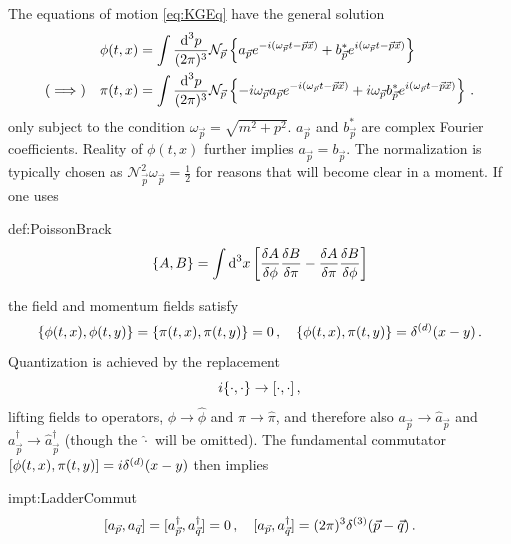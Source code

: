 The equations of motion \eqref{eq:KGEq} have the general solution
\begin{subequations}
    \begin{align}
        \phi(t,x)               & =\int\frac{\text{d} ^3p}{(2\pi)^3}\mathcal{N}_{\vec{p}}\left\{a_{\vec{p}}e^{-{i}(\omega_{\vec{p}}t-\vec{p}\vec{x})}+b_{\vec{p}}^* e^{{i}(\omega_{\vec{p}}t-\vec{p}\vec{x})}\right\}                                                 \\
        (\implies)\quad\pi(t,x) & =\int\frac{\text{d} ^3p}{(2\pi)^3}\mathcal{N}_{\vec{p}}\left\{-{i}\omega_{\vec{p}}a_{\vec{p}}e^{-{i}(\omega_{\vec{p}}t-\vec{p}\vec{x})}+{i}\omega_{\vec{p}}b_{\vec{p}}^* e^{{i}(\omega_{\vec{p}}t-\vec{p}\vec{x})}\right\}\,.
    \end{align}
\end{subequations}
only subject to the condition $\omega_{\vec{p}}=\sqrt{m^2+p^2}$. $a_{\vec{p}}$ and $b_{\vec{p}}^*$ are complex Fourier coefficients. Reality of $\phi(t,x)$ further implies $a_{\vec{p}}=b_{\vec{p}}$. The normalization is typically chosen as $\mathcal{N}_{\vec{p}}^2\omega_{\vec{p}}=\frac{1}{2}$ for reasons that will become clear in a moment. If one uses
\begin{defin}{def:PoissonBrack}
    \begin{equation}
        {\{A,B\}}=\int\text{d}^3x\left[\frac{\delta A}{\delta\phi}\frac{\delta B}{\delta\pi}-\frac{\delta A}{\delta\pi}\frac{\delta B}{\delta\phi}\right]
    \end{equation}
\end{defin}
the field and momentum fields satisfy
\begin{equation}
    {\{\phi(t,x),\phi(t,y)\}}={\{\pi(t,x),\pi(t,y)\}}=0\,,\quad{\{\phi(t,x),\pi(t,y)\}}=\delta^{(d)}(x-y)\,.
\end{equation}
Quantization is achieved by the replacement
\begin{equation}
    {i}\{\cdot,\cdot\}\to{[\cdot,\cdot]}\,,
\end{equation}
lifting fields to operators, $\phi\to\hat{\phi}$ and $\pi\to\hat{\pi}$, and therefore also $a_{\vec{p}}\to\hat{a}_{\vec{p}}$ and $a_{\vec{p}}^\dagger\to\hat{a}_{\vec{p}}^\dagger$ (though the $\hat{\cdot}$ will be omitted). The fundamental commutator ${[\phi(t,x),\pi(t,y)]}={i}\delta^{(d)}(x-y)$ then implies
\begin{impt}{impt:LadderCommut}
    \begin{equation}
        {[a_{\vec{p}},a_{\vec{q}}]}={[a_{\vec{p}}^\dagger,a_{\vec{q}}^\dagger]}=0\,,\quad{[a_{\vec{p}},a_{\vec{q}}^\dagger]}=(2\pi)^3\delta^{(3)}(\vec{p}-\vec{q})\,.
    \end{equation}
\end{impt}

